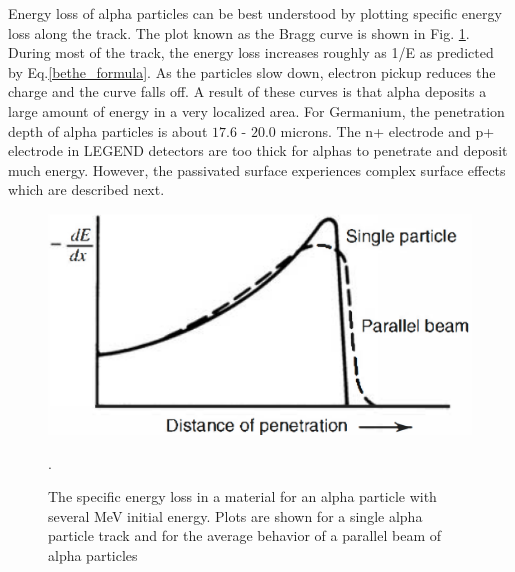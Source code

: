 Energy loss of alpha particles can be best understood by plotting specific energy loss along the track. The plot known as the Bragg curve is shown in Fig. \ref{bragg_curve_fig}. During most of the track, the energy loss increases roughly as 1/E as predicted by Eq.\ref{bethe_formula}. As the particles slow down, electron pickup reduces the charge and the curve falls off. A result of these curves is that alpha deposits a large amount of energy in a very localized area. For Germanium, the penetration depth of alpha particles is about $17.6$ - $20.0$ microns. The n+ electrode and p+ electrode in LEGEND detectors are too thick for alphas to penetrate and deposit much energy. However, the passivated surface experiences complex surface effects which are described next.

\begin{figure}
\centering
\includegraphics[width=0.5\linewidth]{ch3/figs/bragg_curve.png}
\caption{The specific energy loss in a material for an alpha particle with several MeV initial energy. Plots are shown for a single alpha particle track and for the average behavior of a parallel beam of alpha particles \cite{knoll_2010}}. 
\label{bragg_curve_fig}
\end{figure}



  

